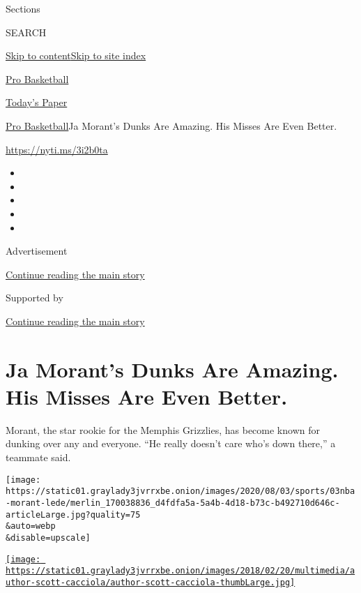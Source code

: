 Sections

SEARCH

\protect\hyperlink{site-content}{Skip to
content}\protect\hyperlink{site-index}{Skip to site index}

\href{https://www.nytimes3xbfgragh.onion/section/sports/basketball}{Pro
Basketball}

\href{https://myaccount.nytimes3xbfgragh.onion/auth/login?response_type=cookie\&client_id=vi}{}

\href{https://www.nytimes3xbfgragh.onion/section/todayspaper}{Today's
Paper}

\href{/section/sports/basketball}{Pro Basketball}\textbar{}Ja Morant's
Dunks Are Amazing. His Misses Are Even Better.

\url{https://nyti.ms/3i2b0ta}

\begin{itemize}
\item
\item
\item
\item
\item
\end{itemize}

Advertisement

\protect\hyperlink{after-top}{Continue reading the main story}

Supported by

\protect\hyperlink{after-sponsor}{Continue reading the main story}

\hypertarget{ja-morants-dunks-are-amazing-his-misses-are-even-better}{%
\section{Ja Morant's Dunks Are Amazing. His Misses Are Even
Better.}\label{ja-morants-dunks-are-amazing-his-misses-are-even-better}}

Morant, the star rookie for the Memphis Grizzlies, has become known for
dunking over any and everyone. ``He really doesn't care who's down
there,'' a teammate said.

\texttt{[image: https://static01.graylady3jvrrxbe.onion/images/2020/08/03/sports/03nba-morant-lede/merlin\_170038836\_d4fdfa5a-5a4b-4d18-b73c-b492710d646c-articleLarge.jpg?quality=75\\\&auto=webp\\\&disable=upscale]}

\href{https://www.nytimes3xbfgragh.onion/by/scott-cacciola}{\texttt{[image: https://static01.graylady3jvrrxbe.onion/images/2018/02/20/multimedia/author-scott-cacciola/author-scott-cacciola-thumbLarge.jpg]}}

